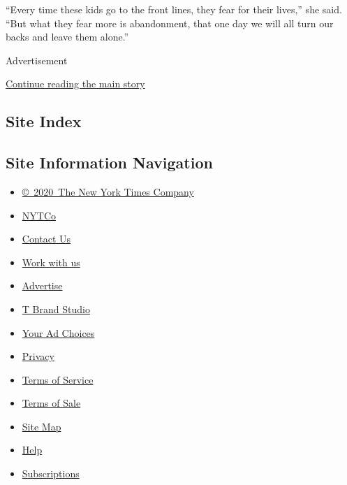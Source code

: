 ``Every time these kids go to the front lines, they fear for their
lives,'' she said. ``But what they fear more is abandonment, that one
day we will all turn our backs and leave them alone.''

Advertisement

\protect\hyperlink{after-bottom}{Continue reading the main story}

\hypertarget{site-index}{%
\subsection{Site Index}\label{site-index}}

\hypertarget{site-information-navigation}{%
\subsection{Site Information
Navigation}\label{site-information-navigation}}

\begin{itemize}
\tightlist
\item
  \href{https://help.nytimes3xbfgragh.onion/hc/en-us/articles/115014792127-Copyright-notice}{©~2020~The
  New York Times Company}
\end{itemize}

\begin{itemize}
\tightlist
\item
  \href{https://www.nytco.com/}{NYTCo}
\item
  \href{https://help.nytimes3xbfgragh.onion/hc/en-us/articles/115015385887-Contact-Us}{Contact
  Us}
\item
  \href{https://www.nytco.com/careers/}{Work with us}
\item
  \href{https://nytmediakit.com/}{Advertise}
\item
  \href{http://www.tbrandstudio.com/}{T Brand Studio}
\item
  \href{https://www.nytimes3xbfgragh.onion/privacy/cookie-policy\#how-do-i-manage-trackers}{Your
  Ad Choices}
\item
  \href{https://www.nytimes3xbfgragh.onion/privacy}{Privacy}
\item
  \href{https://help.nytimes3xbfgragh.onion/hc/en-us/articles/115014893428-Terms-of-service}{Terms
  of Service}
\item
  \href{https://help.nytimes3xbfgragh.onion/hc/en-us/articles/115014893968-Terms-of-sale}{Terms
  of Sale}
\item
  \href{https://spiderbites.nytimes3xbfgragh.onion}{Site Map}
\item
  \href{https://help.nytimes3xbfgragh.onion/hc/en-us}{Help}
\item
  \href{https://www.nytimes3xbfgragh.onion/subscription?campaignId=37WXW}{Subscriptions}
\end{itemize}
